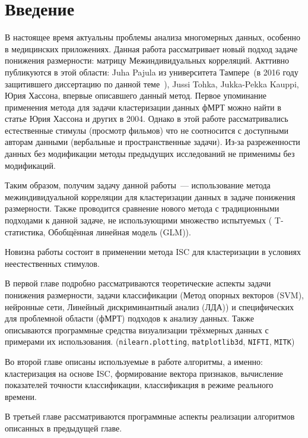 \chapter*{Введение}
\label{sec:afterwords}

В настоящее время актуальны проблемы анализа многомерных данных, особенно в медицинских приложениях.
Данная работа рассматривает новый подход задаче понижения размерности: матрицу Межиндивидуальных корреляций. Акттивно публикуются в этой области: Juha Pajula из университета Тампере~(в 2016 году защитившего диссертацию по данной теме \cite{pajula_ISC_thes}\,), Jussi Tohka, Jukka-Pekka Kauppi, Юрия Хассона, впервые описавшего данный метод. Первое упоминание применения метода для задачи кластеризации данных фМРТ можно найти в статье Юрия Хассона и других в 2004\cite{Hasson1634}.
Однако в этой работе рассматривались естественные стимулы (просмотр фильмов) что не соотносится с доступными авторам данными (вербальные и пространственные задачи). Из-за разреженности данных без модификации методы
предыдущих исследований не применимы без модификаций.

Таким образом, получим задачу данной работы~--- использование метода межиндивидуальной корреляции для кластеризации данных в задаче понижения размерности. Также проводится сравнение нового метода с традиционными подходами к данной задаче, не использующими множество испытуемых ( T-статистика, Обобщённая линейная модель (GLM)).

Новизна работы состоит в применении метода ISC для кластеризации в условиях неестественных стимулов.

В первой главе подробно рассматриваются теоретические аспекты задачи понижения размерности, задачи классификации (Метод опорных векторов (SVM), нейронные сети, Линейный дискриминантный анализ (ЛДА)) и специфических для проблемной области (фМРТ) подходов к анализу данных. Также описываются программные средства визуализации трёхмерных данных с примерами их использования. (\verb|nilearn.plotting|\cite{10.3389/fninf.2014.00014}, \verb|matplotlib3d|\cite{Hunter:2007}, \verb|NIFTI|, \verb|MITK|\cite{wolf2004medical})

Во второй главе описаны используемые в работе алгоритмы, а именно: кластеризация на основе ISC, формирование вектора признаков, вычисление показателей точности классификации, классификация в режиме реального времени.

В третьей главе рассматриваются программные аспекты реализации алгоритмов описанных в предыдущей главе.

